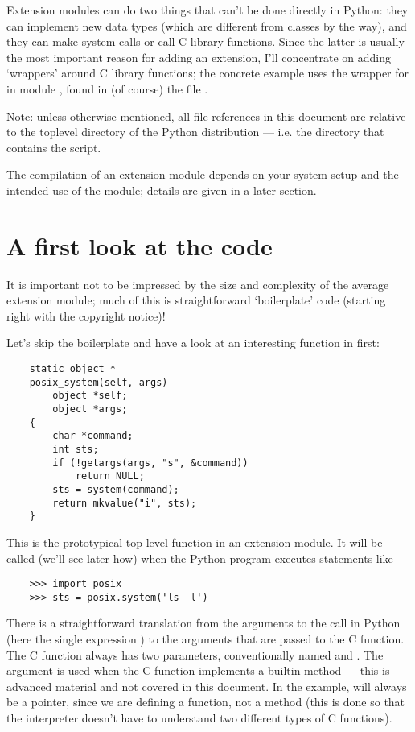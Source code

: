 Extension modules can do two things that can't be done directly in
Python: they can implement new data types (which are different from
classes by the way), and they can make system calls or call C library
functions.  Since the latter is usually the most important reason for
adding an extension, I'll concentrate on adding `wrappers' around C
library functions; the concrete example uses the wrapper for
 in module , found in (of course) the file
.

Note: unless otherwise mentioned, all file references in this
document are relative to the toplevel directory of the Python
distribution --- i.e. the directory that contains the 
script.

The compilation of an extension module depends on your system setup
and the intended use of the module; details are given in a later
section.


\section{A first look at the code}

It is important not to be impressed by the size and complexity of
the average extension module; much of this is straightforward
`boilerplate' code (starting right with the copyright notice)!

Let's skip the boilerplate and have a look at an interesting function
in  first:

\begin{verbatim}
    static object *
    posix_system(self, args)
        object *self;
        object *args;
    {
        char *command;
        int sts;
        if (!getargs(args, "s", &command))
            return NULL;
        sts = system(command);
        return mkvalue("i", sts);
    }
\end{verbatim}

This is the prototypical top-level function in an extension module.
It will be called (we'll see later how) when the Python program
executes statements like

\begin{verbatim}
    >>> import posix
    >>> sts = posix.system('ls -l')
\end{verbatim}

There is a straightforward translation from the arguments to the call
in Python (here the single expression ) to the arguments that
are passed to the C function.  The C function always has two
parameters, conventionally named  and .  The
 argument is used when the C function implements a builtin
method --- this is advanced material and not covered in this document.
In the example,  will always be a  pointer, since
we are defining a function, not a method (this is done so that the
interpreter doesn't have to understand two different types of C
functions).

